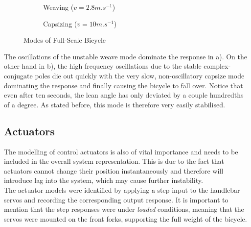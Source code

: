 \begin{figure}[H]
	\begin{subfigure}[t]{0.5\textwidth}
	\caption{Weaving ($v=2.8\si{m.s^{-1}}$)}
	\end{subfigure}
	\quad
	\begin{subfigure}[t]{0.5\textwidth}
	\caption{Capsizing ($v=10\si{m.s^{-1}}$)}
	\end{subfigure}
	\caption{Modes of Full-Scale Bicycle}
	\label{fig:FSModes}
\end{figure}

The oscillations of the unstable weave mode dominate the response in a). On the other hand in b), the high frequency oscillations due to the stable complex-conjugate poles die out quickly with the very slow, non-oscillatory capsize mode dominating the response and finally causing the bicycle to fall over. Notice that even after ten seconds, the lean angle has only deviated by a couple hundredths of a degree. As stated before, this mode is therefore very easily stabilised. 

\subsection{Actuators}
The modelling of control actuators is also of vital importance and needs to be included in the overall system representation. This is due to the fact that actuators cannot change their position instantaneously and therefore will introduce lag into the system, which may cause further instability. \\

The actuator models were identified by applying a step input to the handlebar servos and recording the corresponding output response. It is important to mention that the step responses were under \textit{loaded} conditions, meaning that the servos were mounted on the front forks, supporting the full weight of the bicycle. \\

